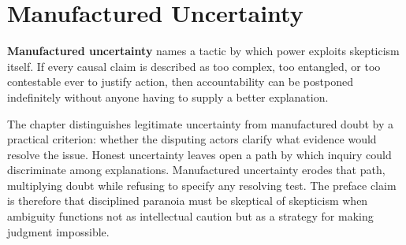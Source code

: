 
\chapter{Manufactured Uncertainty}
\label{ch:ch063}


\textbf{Manufactured uncertainty} names a tactic by which power exploits skepticism itself. If every causal claim is described as too complex, too entangled, or too contestable ever to justify action, then accountability can be postponed indefinitely without anyone having to supply a better explanation.

The chapter distinguishes legitimate uncertainty from manufactured doubt by a practical criterion: whether the disputing actors clarify what evidence would resolve the issue. Honest uncertainty leaves open a path by which inquiry could discriminate among explanations. Manufactured uncertainty erodes that path, multiplying doubt while refusing to specify any resolving test. The preface claim is therefore that disciplined paranoia must be skeptical of skepticism when ambiguity functions not as intellectual caution but as a strategy for making judgment impossible.
